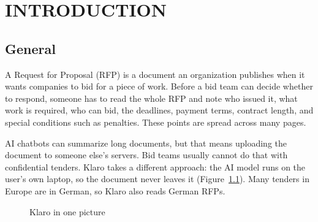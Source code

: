\documentclass[11pt,a4paper,oneside]{report}
\newcommand{\nonum}{}%
\newcommand{\st}[2]{\textbf{#1}\\[-1pt]{\scriptsize #2}}
\begin{document}
\chapter{INTRODUCTION}\nonum

\section{General}
A Request for Proposal (RFP) is a document an organization publishes when it wants companies to bid
for a piece of work. Before a bid team can decide whether to respond, someone has to read the whole
RFP and note who issued it, what work is required, who can bid, the deadlines, payment terms,
contract length, and special conditions such as penalties. These points are spread across many pages.

AI chatbots can summarize long documents, but that means uploading the document to someone else's
servers. Bid teams usually cannot do that with confidential tenders. Klaro takes a different
approach: the AI model runs on the user's own laptop, so the document never leaves it
(Figure~\ref{fig:overview}). Many tenders in Europe are in German, so Klaro also reads German RFPs.

\begin{figure}[H]
\centering
{}
\caption{Klaro in one picture}
\label{fig:overview}
\end{figure}
\end{document}
